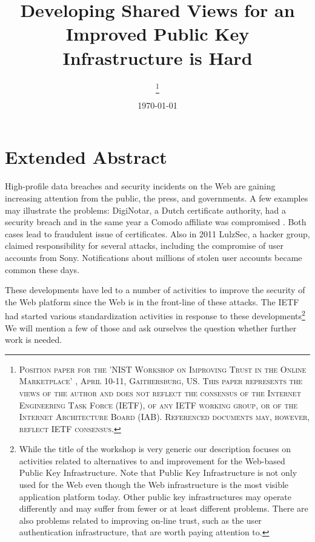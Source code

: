 \documentclass[a4paper, 10pt]{IEEEtran}
\begin{document}
\title{Developing Shared Views for an Improved Public Key Infrastructure  is Hard}
\author{
\thanks{\textsc{
Position paper for the 'NIST Workshop on Improving Trust in the Online Marketplace' , April 10-11, Gaithersburg, US. This paper represents the views of the author and does not reflect the consensus of the Internet Engineering Task Force (IETF), of any IETF working group, or of the Internet Architecture Board (IAB). Referenced documents may, however, reflect IETF consensus.}}
}

\date{\today}

\maketitle

\section{Extended Abstract}

High-profile data breaches and security incidents on the Web are gaining increasing attention from the public, the press, and governments. A few examples may illustrate the problems: DigiNotar, a Dutch certificate authority, had a security breach \cite{DigiNotar} and in the same year a Comodo affiliate was compromised \cite{comodo}. Both cases lead to fraudulent issue of certificates. Also in 2011 LulzSec, a hacker group, claimed responsibility for several attacks, including the compromise of user accounts from Sony. Notifications about millions of stolen user accounts became common these days. 

These developments have led to a number of activities to improve the security of the Web platform since the Web is in the front-line of these attacks. The IETF had started various standardization activities in response to these developments\footnote{While the title of the workshop is very generic our description focuses on activities related to alternatives to and improvement for the Web-based Public Key Infrastructure. Note that Public Key Infrastructure is not only used for the Web even though the Web infrastructure is the most visible application platform today. Other public key infrastructures may operate differently and may suffer from fewer or at least different problems. There are also problems related to improving on-line trust, such as the user authentication infrastructure, that are worth paying attention to.} We will mention a few of those and ask ourselves the question whether further work is needed. 
\end{document}
